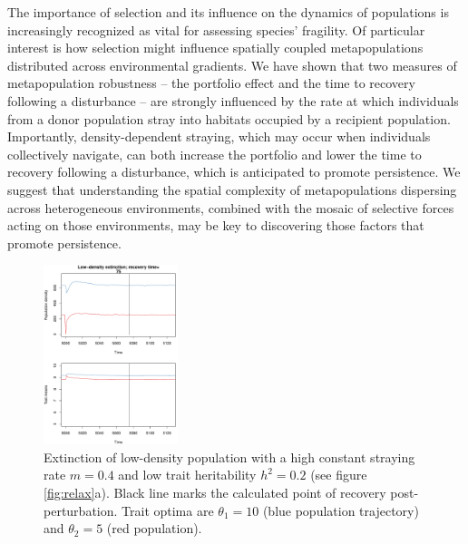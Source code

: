 \documentclass[twocolumn,preprintnumbers,amsmath,amssymb,superscriptaddress]{revtex4}
\newcommand{\beginsupplement}{%
        \clearpage
        \setcounter{table}{0}
        \renewcommand{\thetable}{S\arabic{table}}%
        \setcounter{figure}{0}
        \renewcommand{\thefigure}{S\arabic{figure}}%
     }
\begin{document}
The importance of selection and its influence on the dynamics of populations is increasingly recognized as vital for assessing species' fragility.
Of particular interest is how selection might influence spatially coupled metapopulations distributed across environmental gradients.
We have shown that two measures of metapopulation robustness -- the portfolio effect and the time to recovery following a disturbance -- are strongly influenced by the rate at which individuals from a donor population stray into habitats occupied by a recipient population.
Importantly, density-dependent straying, which may occur when individuals collectively navigate, can both increase the portfolio and lower the time to recovery following a disturbance, which is anticipated to promote persistence.
We suggest that understanding the spatial complexity of metapopulations dispersing across heterogeneous environments, combined with the mosaic of selective forces acting on those environments, may be key to discovering those factors that promote persistence.





\beginsupplement


\begin{figure}
  \captionsetup{justification=raggedright,
singlelinecheck=false
}
\centering
\includegraphics[width=0.35\textwidth]{figs2/fig_relax_small.pdf}
\caption{
Extinction of low-density population with a high constant straying rate $m=0.4$ and low trait heritability $h^2=0.2$ (see figure \ref{fig:relax}a).
Black line marks the calculated point of recovery post-perturbation.
Trait optima are $\theta_1 = 10$ (blue population trajectory) and $\theta_2 = 5$ (red population).
} \label{fig:relaxtraj_ldlh}
\end{figure}
\end{document}
